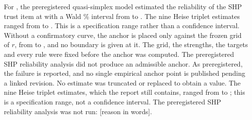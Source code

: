 For , the preregistered quasi-simplex model estimated the reliability of the SHP trust item at  with a Wald \% interval from  to . The nine Heise triplet estimates ranged from  to . This is a specification range rather than a confidence interval. %
Without a confirmatory curve, the anchor is placed only against the frozen grid of $r$, from  to , and no boundary is given at it. %
The grid, the strengths, the targets and every rule were fixed before the anchor was computed. %
The preregistered SHP reliability analysis did not produce an admissible anchor. %
As preregistered, the failure is reported, and no single empirical anchor point is published pending a linked revision. No estimate was truncated or replaced to obtain a value. %
The nine Heise triplet estimates, which the report still contains, ranged from  to ; this is a specification range, not a confidence interval. %
The preregistered SHP reliability analysis was not run: [reason in words]. %


